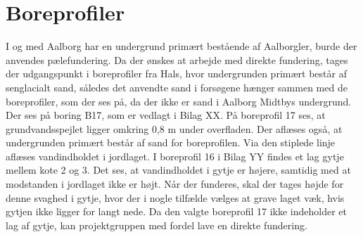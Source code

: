 \section{Boreprofiler} 
I og med Aalborg har en undergrund primært bestående af Aalborgler, burde der anvendes pælefundering. Da der ønskes at arbejde med direkte fundering, tages der udgangspunkt i boreprofiler fra Hals, hvor undergrunden primært består af senglacialt sand, således det anvendte sand i forsøgene hænger sammen med de boreprofiler, som der ses på, da der ikke er sand i Aalborg Midtbys undergrund. Der ses på boring B17, som er vedlagt i Bilag XX.  
\newline \indent{     }  På boreprofil 17 ses, at grundvandsspejlet ligger omkring 0,8 m under overfladen. Der aflæses også, at undergrunden primært består af sand for boreprofilen. Via den stiplede linje aflæses vandindholdet i jordlaget. 
\newline \indent{     }  I boreprofil 16 i Bilag YY findes et lag gytje mellem kote 2 og 3. Det ses, at vandindholdet i gytje er højere, samtidig med at modstanden i jordlaget ikke er højt. Når der funderes, skal der tages højde for denne svaghed i gytje, hvor der i nogle tilfælde vælges at grave laget væk, hvis gytjen ikke ligger for langt nede. Da den valgte boreprofil 17 ikke indeholder et lag af gytje, kan projektgruppen med fordel lave en direkte fundering.